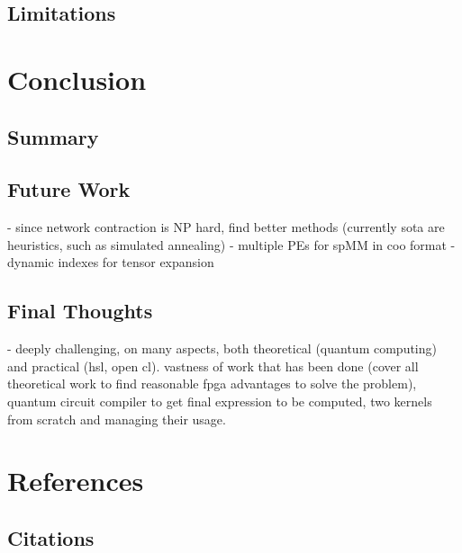 \documentclass[12pt,oneside,a4paper]{article}
\begin{document}
\subsection{Limitations}





\section{Conclusion}

\subsection{Summary}

\subsection{Future Work}
- since network contraction is NP hard, find better methods (currently sota are heuristics, such as simulated annealing)
- multiple PEs for spMM in coo format
- dynamic indexes for tensor expansion

\subsection{Final Thoughts}
- deeply challenging, on many aspects, both theoretical (quantum computing) and practical (hsl, open cl). vastness of work that has been done (cover all theoretical work to find reasonable fpga advantages to solve the problem), quantum circuit compiler to get final expression to be computed, two kernels from scratch and managing their usage.





\section{References}

\subsection{Citations}
\end{document}
